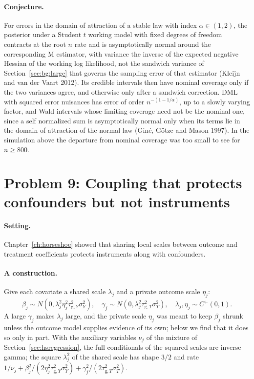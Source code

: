 \paragraph{Conjecture.} For errors in the domain of attraction of a stable law with index $\alpha \in (1, 2)$, the posterior under a Student $t$ working model with fixed degrees of freedom contracts at the root $n$ rate and is asymptotically normal around the corresponding M estimator, with variance the inverse of the expected negative Hessian of the working log likelihood, not the sandwich variance of Section~\ref{sec:bg:large} that governs the sampling error of that estimator (Kleijn and van der Vaart 2012). Its credible intervals then have nominal coverage only if the two variances agree, and otherwise only after a sandwich correction. DML with squared error nuisances has error of order $n^{-(1 - 1/\alpha)}$, up to a slowly varying factor, and Wald intervals whose limiting coverage need not be the nominal one, since a self normalized sum is asymptotically normal only when its terms lie in the domain of attraction of the normal law (Gin\'e, G\"otze and Mason 1997). In the simulation above the departure from nominal coverage was too small to see for $n \ge 800$.

\section{Problem 9: Coupling that protects confounders but not instruments}

\paragraph{Setting.} Chapter~\ref{ch:horseshoe} showed that sharing local scales between outcome and treatment coefficients protects instruments along with confounders.

\paragraph{A construction.} Give each covariate a shared scale $\lambda_j$ and a private outcome scale $\eta_j$:
\[
\beta_j \sim N(0, \lambda_j^2\eta_j^2\tau_{\mathrm{g},Y}^2\sigma_Y^2), \quad \gamma_j \sim N(0, \lambda_j^2\tau_{\mathrm{g},T}^2\sigma_T^2), \quad \lambda_j, \eta_j \sim C^+(0,1).
\]
A large $\gamma_j$ makes $\lambda_j$ large, and the private scale $\eta_j$ was meant to keep $\beta_j$ shrunk unless the outcome model supplies evidence of its own; below we find that it does so only in part. With the auxiliary variables $\nu_j$ of the mixture of Section~\ref{sec:hsregression}, the full conditionals of the squared scales are inverse gamma; the square $\lambda_j^2$ of the shared scale has shape $3/2$ and rate $1/\nu_j + \beta_j^2/(2\eta_j^2\tau_{\mathrm{g},Y}^2\sigma_Y^2) + \gamma_j^2/(2\tau_{\mathrm{g},T}^2\sigma_T^2)$.

